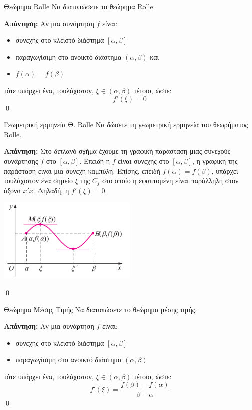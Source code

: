 \documentclass[a4paper, 12pt]{article}
\renewenvironment{proof}[1][\textbf{Απάντηση}]{%
  \par\noindent\textbf{#1:} \rmfamily}{\qed\par}
\begin{document}
\begin{theorem}{Θεώρημα Rolle}
  Να διατυπώσετε το θεώρημα Rolle.
\end{theorem}
\begin{proof}
  Αν μια συνάρτηση $f$ είναι:
  \begin{itemize}
    \item συνεχής στο κλειστό διάστημα $[α, β]$
    \item παραγωγίσιμη στο ανοικτό διάστημα $(α, β)$ και
    \item $f(α) = f(β)$
  \end{itemize}
  τότε υπάρχει ένα, τουλάχιστον, $ξ \in (α , β )$ τέτοιο, ώστε:
  $$f ′(ξ) = 0$$
\end{proof}

\begin{theorem}{Γεωμετρική ερμηνεία Θ. Rolle}
  Να δώσετε τη γεωμετρική ερμηνεία του θεωρήματος Rolle.
\end{theorem}
\begin{proof}
  Στο διπλανό σχήμα έχουμε τη γραφική παράσταση μιας συνεχούς συνάρτησης $f$ στο $[α, β]$. Επειδή η $f$ είναι συνεχής στο $[α, β]$, η γραφική της παράσταση είναι μια συνεχή καμπύλη. Επίσης, επειδή $f(α) = f(β)$, υπάρχει τουλάχιστον ένα σημείο $ξ$ της $C_f$ στο οποίο η εφαπτομένη είναι παράλληλη στον άξονα $x′x$. Δηλαδή, η $f ′(ξ) = 0$.
  \begin{center}
    \includegraphics[width=0.5\textwidth]{images/geoRolle}
  \end{center}
\end{proof}

\begin{theorem}{Θεώρημα Μέσης Τιμής}
  Να διατυπώσετε το θεώρημα μέσης τιμής.
\end{theorem}
\begin{proof}
  Αν μια συνάρτηση $f$ είναι:
  \begin{itemize}
    \item συνεχής στο κλειστό διάστημα $[α, β]$
    \item παραγωγίσιμη στο ανοικτό διάστημα $(α, β)$
  \end{itemize}
  τότε υπάρχει ένα, τουλάχιστον, $ξ \in (α , β )$ τέτοιο, ώστε:
  $$f ′(ξ) = \dfrac{f(β) - f(α)}{β - α}$$
\end{proof}
\end{document}
